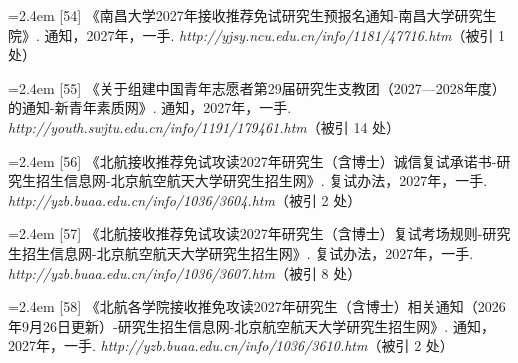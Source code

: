 {\vspace{3.5pt}\par
\nopagebreak\vspace{1pt}
\noindent\hangindent=2.4em \label{src:S0060}{\color{cAccent}[54]} 《南昌大学2027年接收推荐免试研究生预报名通知-南昌大学研究生院》. 通知，2027年，一手. \textit{http://yjsy.ncu.edu.cn/info/1181/47716.htm}（被引 1 处）\par
\vspace{0.6pt}
\vspace{3.5pt}\par
\nopagebreak\vspace{1pt}
\noindent\hangindent=2.4em \label{src:S0061}{\color{cAccent}[55]} 《关于组建中国青年志愿者第29届研究生支教团（2027—2028年度）的通知-新青年素质网》. 通知，2027年，一手. \textit{http://youth.swjtu.edu.cn/info/1191/179461.htm}（被引 14 处）\par
\vspace{0.6pt}
\vspace{3.5pt}\par
\nopagebreak\vspace{1pt}
\noindent\hangindent=2.4em \label{src:S0063}{\color{cAccent}[56]} 《北航接收推荐免试攻读2027年研究生（含博士）诚信复试承诺书-研究生招生信息网-北京航空航天大学研究生招生网》. 复试办法，2027年，一手. \textit{http://yzb.buaa.edu.cn/info/1036/3604.htm}（被引 2 处）\par
\vspace{0.6pt}
\noindent\hangindent=2.4em \label{src:S0064}{\color{cAccent}[57]} 《北航接收推荐免试攻读2027年研究生（含博士）复试考场规则-研究生招生信息网-北京航空航天大学研究生招生网》. 复试办法，2027年，一手. \textit{http://yzb.buaa.edu.cn/info/1036/3607.htm}（被引 8 处）\par
\vspace{0.6pt}
\noindent\hangindent=2.4em \label{src:S0065}{\color{cAccent}[58]} 《北航各学院接收推免攻读2027年研究生（含博士）相关通知（2026年9月26日更新）-研究生招生信息网-北京航空航天大学研究生招生网》. 通知，2027年，一手. \textit{http://yzb.buaa.edu.cn/info/1036/3610.htm}（被引 2 处）\par
\vspace{0.6pt}
\vspace{3.5pt}\par
\nopagebreak\vspace{1pt}
}
